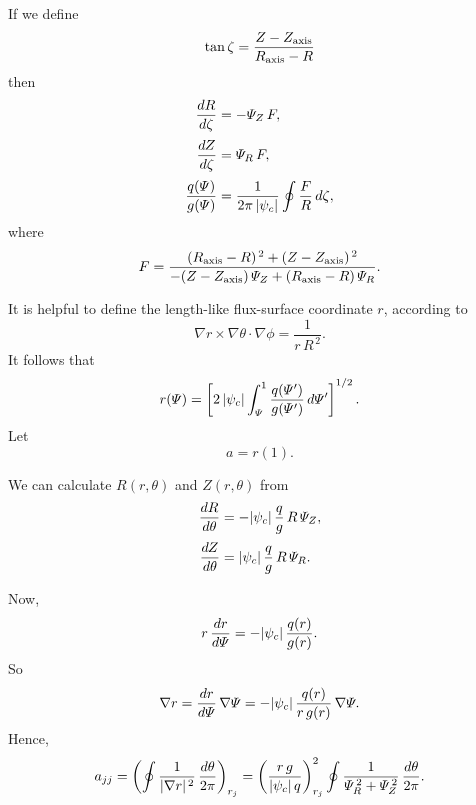\documentclass[12pt]{article}
\begin{document}
If we define
\begin{equation}
\tan\zeta = \frac{Z-Z_{\rm axis}}{R_{\rm axis}-R}
\end{equation}
then
\begin{align}
\frac{dR}{d\zeta} &= -{\mit\Psi}_Z\,F,\\[0.5ex]
\frac{dZ}{d\zeta} &= {\mit\Psi}_R\,F,\\[0.5ex]
\frac{q({\mit\Psi})}{g({\mit\Psi})} &= \frac{1}{2\pi\,|\psi_c|}\oint \frac{F}{R}\,d\zeta,
\end{align}
where
\begin{equation}
F = \frac{(R_{\rm axis}-R)^{\,2} + (Z-Z_{\rm axis})^{\,2}}{-(Z-Z_{\rm axis})\,{\mit\Psi}_Z + (R_{\rm axis}-R)\,{\mit\Psi}_R}.
\end{equation}

It is helpful to define the length-like flux-surface coordinate $r$, according to
\begin{equation}
\nabla r\times \nabla\theta\cdot\nabla \phi = \frac{1}{r\,R^{\,2}}.
\end{equation}
It follows that
\begin{equation}
r({\mit\Psi}) = \left[2\,|\psi_c|\int_{{\mit\Psi}}^1\frac{q({\mit\Psi}')}
{g({\mit\Psi}')}\,d{\mit\Psi}'\right]^{1/2}.
\end{equation}
Let
\begin{equation}
a = r (1).
\end{equation}

We can calculate $R(r,\theta)$ and $Z(r,\theta)$ from 
\begin{align}
\frac{dR}{d\theta}&=-|\psi_c|\,\frac{q}{g}\,R\,{\mit\Psi}_Z,\\[0.5ex]
\frac{dZ}{d\theta} &= |\psi_c|\,\frac{q}{g}\,R\,{\mit\Psi}_R.
\end{align}

Now,
\begin{equation}
r\,\frac{dr}{d{\mit\Psi}} = -|\psi_c|\,\frac{q(r)}{g(r)}.
\end{equation}
So
\begin{equation}
\nabla r = \frac{dr}{d{\mit\Psi}}\,\nabla{\mit\Psi} = -|\psi_c|\,\frac{q(r)}{r\,g(r)}\,\nabla{\mit\Psi}.
\end{equation}
Hence,
\begin{equation}
a_{jj}  =\left(\oint \frac{1}{|\nabla r|^{\,2}}\,\frac{d\theta}{2\pi}\right)_{r_j} = \left(\frac{r\,g}{|\psi_c|\,q}\right)^2_{r_j}\oint
\frac{1}{{\mit\Psi}_R^{\,2}+{\mit\Psi}_Z^{\,2}}\,\frac{d\theta}{2\pi}.
\end{equation}
\end{document}
